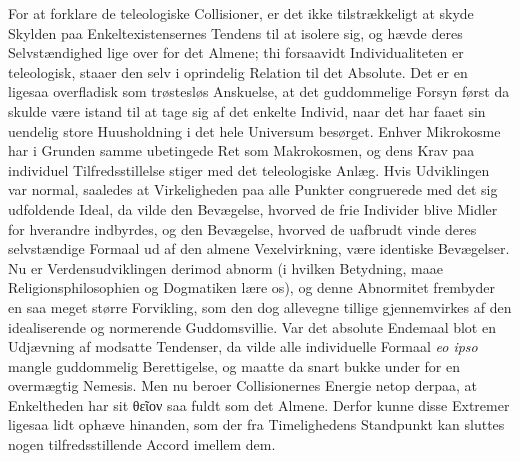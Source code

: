 \documentclass[12pt]{book}
\newcommand{\opage}[1]{\marginnote{\footnotesize\textit{[#1]}}}
\begin{document}
For at forklare de teleologiske Collisioner, er det ikke tilstrækkeligt at skyde
Skylden paa Enkeltexistensernes Tendens til at isolere sig, og hævde deres
Selvstændighed lige over for det Almene; thi forsaavidt Individualiteten er
teleologisk, staaer den selv i oprindelig Relation til det Absolute. Det er en ligesaa
overfladisk som trøstesløs Anskuelse, at det guddommelige Forsyn først da skulde være
istand til at tage sig af det enkelte Individ, naar det har faaet sin uendelig store
Huusholdning i det hele Universum besørget. Enhver Mikrokosme har i Grunden samme
ubetingede Ret som Makrokosmen, og dens Krav paa individuel Tilfredsstillelse stiger
med det teleologiske Anlæg. Hvis Udviklingen var normal, saaledes at Virkeligheden paa
alle Punkter congruerede med det sig udfoldende Ideal, da vilde den Bevægelse, hvorved
de frie Individer blive Midler for hverandre indbyrdes, og den Bevægelse, hvorved de
uafbrudt vinde deres selvstændige Formaal ud af den almene Vexelvirkning, være
identiske Bevægelser. Nu er Verdensudviklingen derimod abnorm (i hvilken Betydning,
maae Religionsphilosophien og Dogmatiken lære os), og denne Abnormitet frembyder en
saa meget større Forvikling, som den dog allevegne tillige gjennemvirkes af den
idealiserende og normerende Guddomsvillie. Var det absolute Endemaal blot en Udjævning
af modsatte Tendenser, da vilde alle individuelle Formaal \textit{eo ipso} mangle
guddommelig Berettigelse, og maatte da snart bukke under for en overmægtig Nemesis.
Men nu beroer Collisionernes Energie netop derpaa, at Enkeltheden har sit θεῖον saa
\opage{242} fuldt som det Almene. Derfor kunne disse Extremer ligesaa lidt ophæve hinanden, som
der fra Timelighedens Standpunkt kan sluttes nogen tilfredsstillende Accord imellem
dem.
\end{document}
